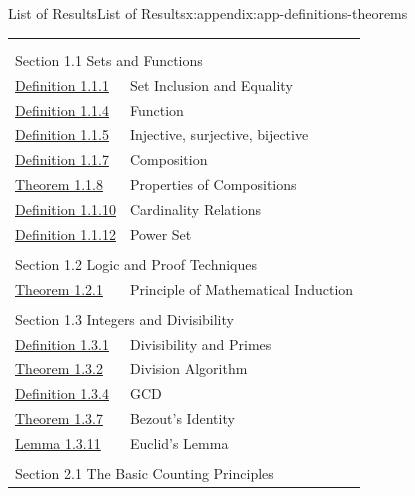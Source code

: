 \documentclass[oneside,10pt,]{book}
\numberwithin{equation}{section}
\begin{document}
\begin{appendixptx}{List of Results}{}{List of Results}{}{}{x:appendix:app-definitions-theorems}
\noindent
\begin{longtable}[l]{ll}
\addtocounter{table}{-1}
\endfirsthead
\endhead
\multicolumn{2}{r}{(Continued on next page)}\\
\endfoot
\endlastfoot
\multicolumn{2}{l}{\null}\\[1.5ex] \multicolumn{2}{l}{\large Section 1.1 Sets and Functions}\\[0.5ex]
\hyperref[x:definition:def-set-inclusion-equality]{Definition 1.1.1}& Set Inclusion and Equality\\
\hyperref[x:definition:def-function]{Definition 1.1.4}& Function\\
\hyperref[x:definition:def-injective]{Definition 1.1.5}& Injective, surjective, bijective\\
\hyperref[x:definition:def-composition]{Definition 1.1.7}& Composition\\
\hyperref[x:theorem:thm-composition-of-bijections]{Theorem 1.1.8}& Properties of Compositions\\
\hyperref[x:definition:def-cardinality]{Definition 1.1.10}& Cardinality Relations\\
\hyperref[x:definition:def-power-set]{Definition 1.1.12}& Power Set\\
\multicolumn{2}{l}{\null}\\[1.5ex] \multicolumn{2}{l}{\large Section 1.2 Logic and Proof Techniques}\\[0.5ex]
\hyperref[x:theorem:thm-induction]{Theorem 1.2.1}& Principle of Mathematical Induction\\
\multicolumn{2}{l}{\null}\\[1.5ex] \multicolumn{2}{l}{\large Section 1.3 Integers and Divisibility}\\[0.5ex]
\hyperref[x:definition:def-divisibility]{Definition 1.3.1}& Divisibility and Primes\\
\hyperref[x:theorem:thm-division-algorithm]{Theorem 1.3.2}& Division Algorithm\\
\hyperref[x:definition:def-gcd]{Definition 1.3.4}& GCD\\
\hyperref[x:theorem:thm-bezout]{Theorem 1.3.7}& Bezout's Identity\\
\hyperref[x:lemma:lem-euclid]{Lemma 1.3.11}& Euclid's Lemma\\
\multicolumn{2}{l}{\null}\\[1.5ex] \multicolumn{2}{l}{\large Section 2.1 The Basic Counting Principles}\\[0.5ex]

\end{longtable}
\end{appendixptx}
\end{document}
